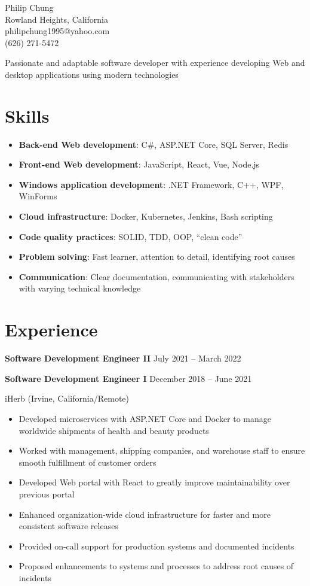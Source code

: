 \documentclass[10pt]{article}
\newcommand{\titleheader}[2]{\textbf{#1} \hfill #2}
\newcommand{\locheader}[2]{#1 (#2)}
\begin{document}
	\begin{center}
		{\LARGE Philip Chung} \\
		Rowland Heights, California \\
		philipchung1995@yahoo.com \\
		(626) 271-5472 \\
	\end{center}

	Passionate and adaptable software developer with experience developing Web and desktop applications using modern technologies

	\section*{Skills}

	\newcommand{\skillitem}[2]{\item \textbf{#1}: #2}

	\begin{itemize}
		\skillitem{Back-end Web development}{C\#, ASP.NET Core, SQL Server, Redis}
		\skillitem{Front-end Web development}{JavaScript, React, Vue, Node.js}
		\skillitem{Windows application development}{.NET Framework, C++, WPF, WinForms}
		\skillitem{Cloud infrastructure}{Docker, Kubernetes, Jenkins, Bash scripting}
		\skillitem{Code quality practices}{SOLID, TDD, OOP, ``clean code''}
		\skillitem{Problem solving}{Fast learner, attention to detail, identifying root causes}
		\skillitem{Communication}{Clear documentation, communicating with stakeholders with varying technical knowledge}
	\end{itemize}

	\section*{Experience}

	\titleheader{Software Development Engineer II}{July 2021 -- March 2022}

	\titleheader{Software Development Engineer I}{December 2018 -- June 2021}

	\locheader{iHerb}{Irvine, California/Remote}

	\begin{itemize}
		\item Developed microservices with ASP.NET Core and Docker to manage worldwide shipments of health and beauty products
		\item Worked with management, shipping companies, and warehouse staff to ensure smooth fulfillment of customer orders
		\item Developed Web portal with React to greatly improve maintainability over previous portal
		\item Enhanced organization-wide cloud infrastructure for faster and more consistent software releases
		\item Provided on-call support for production systems and documented incidents
		\item Proposed enhancements to systems and processes to address root causes of incidents
	\end{itemize}
\end{document}
